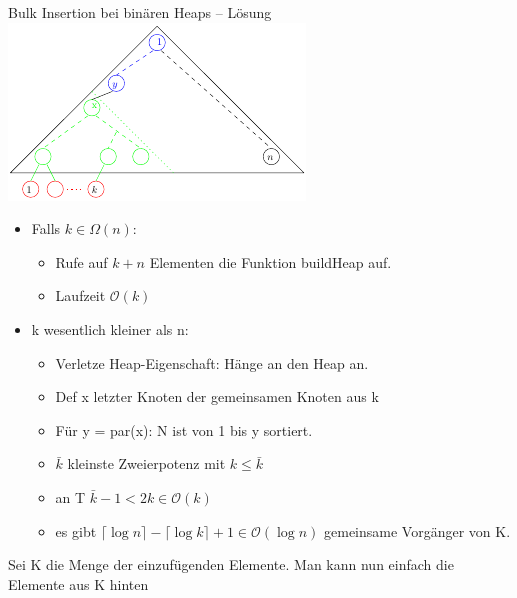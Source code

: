 \documentclass[18pt]{beamer}
\newcommand{\Oh}{\mathcal{O}}
\begin{document}
\begin{frame}{Bulk Insertion bei binären Heaps -- Lösung}
\includegraphics[scale=0.7]{bulkheap}
\begin{itemize}
 \item Falls $k \in \Omega(n)$:
 \begin{itemize}
  \item Rufe auf $k+n$ Elementen die Funktion buildHeap auf.
  \item Laufzeit $\Oh(k)$
 \end{itemize}
  \item k wesentlich kleiner als n:
  \begin{itemize}
   \item Verletze Heap-Eigenschaft: Hänge an den Heap an.
   \item Def x letzter Knoten der gemeinsamen Knoten aus k
   \item Für y = par(x): N ist von 1 bis y sortiert.
   \item $\bar{k}$ kleinste Zweierpotenz mit $k \leq \bar{k}$
   \item an T $\bar{k} - 1 < 2k \in \Oh(k)$
   \item es gibt $\lceil \log n \rceil - \lceil \log k \rceil + 1 \in \Oh(\log n)$ gemeinsame Vorgänger von K.
  \end{itemize}

\end{itemize}

  
 Sei K die Menge der einzufügenden Elemente. Man kann nun einfach die Elemente aus K hinten
 
\end{frame}
\end{document}

